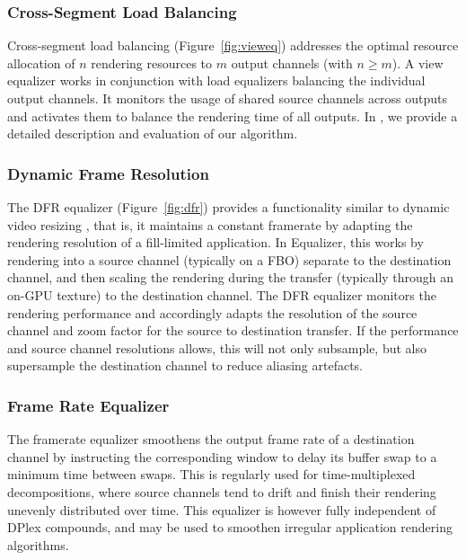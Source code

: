 \documentclass[10pt,journal,compsoc]{IEEEtran}
\newcommand{\fig}[1]{Figure~\ref{#1}}
\begin{document}
\subsubsection{Cross-Segment Load Balancing}

Cross-segment load balancing (\fig{fig:vieweq}) addresses the optimal resource
allocation of $n$ rendering resources to $m$ output channels (with $n\geq m$). A
view equalizer works in conjunction with load equalizers balancing the
individual output channels. It monitors the usage of shared source channels
across outputs and activates them to balance the rendering time of all outputs.
In \cite{EEP:11}, we provide a detailed description and evaluation of our
algorithm.

\subsubsection{Dynamic Frame Resolution}

The DFR equalizer (\fig{fig:dfr}) provides a functionality similar to dynamic
video resizing \cite{MBDM:97}, that is, it maintains a constant framerate by
adapting the rendering resolution of a fill-limited application. In
\textsf{Equalizer}, this works by rendering into a source channel (typically on
a FBO) separate to the destination channel, and then scaling the rendering
during the transfer (typically through an on-GPU texture) to the destination
channel. The DFR equalizer monitors the rendering performance and accordingly
adapts the resolution of the source channel and zoom factor for the source to
destination transfer. If the performance and source channel resolutions allows,
this will not only subsample, but also supersample the destination channel to
reduce aliasing artefacts.

\subsubsection{Frame Rate Equalizer}\label{sec:framerateEq}

The framerate equalizer smoothens the output frame rate of a destination channel
by instructing the corresponding window to delay its buffer swap to a minimum
time between swaps. This is regularly used for time-multiplexed decompositions,
where source channels tend to drift and finish their rendering unevenly
distributed over time. This equalizer is however fully independent of DPlex
compounds, and may be used to smoothen irregular application rendering
algorithms.
\end{document}
